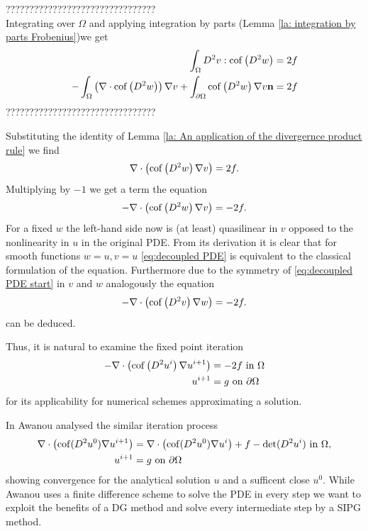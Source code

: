 ???????????????????????????????? \\
Integrating over $\Omega$ and applying integration by parts (Lemma \ref{la: integration by parts Frobenius})we get
\begin{align}
		\int_{\Omega} D^2 v:\operatorname{cof} \left( D^2 w  \right)  &= 2f \\
		-\int_{\Omega} \left( \nabla \cdot \operatorname{cof} \left( D^2 w  \right) \right) \nabla v + \int_{\partial \Omega} \operatorname{cof} \left( D^2 w  \right) \nabla v \mathbf{n} &= 2f
\end{align}
????????????????????????????????


Substituting the identity of Lemma \ref{la: An application of the divergernce product rule} we find
\begin{align}
	\nabla \cdot \left( \operatorname{cof} \left( D^2 w  \right) \nabla v \right) = 2f.
\end{align}
Multiplying by $-1$ we get a term the equation
\begin{align}
	- \nabla \cdot \left( \operatorname{cof} \left(  D^2 w \right) \nabla v \right)  = -2f.  \label{eq:decoupled PDE}
\end{align}
For a fixed $w$ the left-hand side now is (at least) quasilinear in $v$ opposed to the nonlinearity in $u$ in the original PDE. From its derivation it is clear that for smooth functions $w=u, v=u$ \eqref{eq:decoupled PDE} is equivalent to the classical formulation of the \MA equation. Furthermore due to the symmetry of \eqref{eq:decoupled PDE start} in $v$ and $w$ analogously the equation 
\begin{align}
	- \nabla \cdot \left( \operatorname{cof} \left(  D^2 v \right) \nabla w \right)  = -2f.  \label{eq:decoupled PDE two}
\end{align}
can be deduced.

Thus, it is natural to examine the fixed point iteration
\begin{align}
	\begin{split}
	- \nabla \cdot \left( \operatorname{cof} \left(  D^2 u^i \right) \nabla u^{i+1} \right)  &= -2f  \text{ in } \Omega \\
		u^{i+1} &= g \textnormal{ on } \partial \Omega
	\label{eq:fixed point iteration}
	\end{split}
\end{align}
for its applicability for numerical schemes approximating a \MA solution.

In \cite{Awanou2014} Awanou analysed the similar iteration process
\begin{align*}
	\nabla \cdot \left( \operatorname{cof}(D^2 u^0) \nabla u^{i+1} \right) &= \nabla \cdot \left( \operatorname{cof}(D^2 u^0) \nabla u^{i} \right) + f - \operatorname{det} (D^2u^i) \textnormal{ in } \Omega, \\
	u^{i+1} &= g \textnormal{ on } \partial \Omega
\end{align*}
showing convergence for the analytical solution $u$ and a sufficent close $u^0$. While Awanou uses a finite difference scheme to solve the PDE in every step we want to exploit the benefits of a DG method and solve every intermediate step by a SIPG method. 

